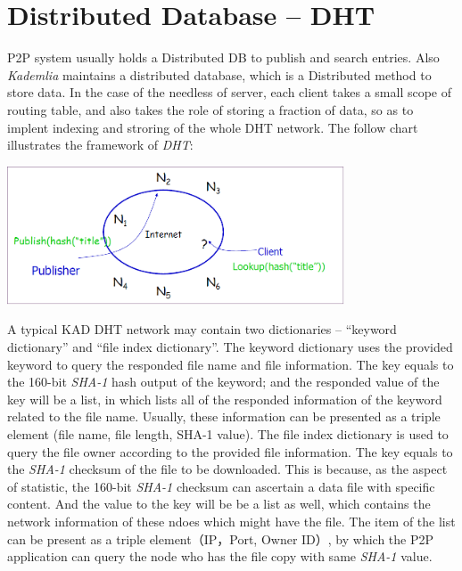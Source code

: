 \section{Distributed Database -- DHT}
{
P2P system usually holds a Distributed DB to publish and search entries.
Also \emph{Kademlia} maintains a distributed database, which is a Distributed method to store data. 
In the case of the needless of server, each client takes a small scope of routing table, and also takes the role of storing a fraction of data, so as to implent indexing and stroring of the whole DHT network.
The follow chart illustrates the framework of \emph{DHT}:
\begin{center}
  \includegraphics[width=10cm]{data/DHT.png}
\end{center}

A typical KAD DHT network may contain two dictionaries -- ``keyword dictionary'' and ``file index dictionary''.
The keyword dictionary uses the provided keyword to query the responded file name and file information. 
The key equals to the 160-bit \emph{SHA-1} hash output of the keyword; and the responded value of the key will be a list, in which lists all of the responded information of the keyword related to the file name.
Usually, these information can be presented as a triple element (file name, file length, SHA-1 value). 
The file index dictionary is used to query the file owner according to the provided file information. 
The key equals to the \emph{SHA-1} checksum of the file to be downloaded. This is because, as the aspect of statistic, the 160-bit \emph{SHA-1} checksum can ascertain a data file with specific content.
And the value to the key will be be a list as well, which contains the network information of these ndoes which might have the file.
The item of the list can be present as a triple element（IP，Port, Owner ID）, by which the P2P application can query the node who has the file copy with same \emph{SHA-1} value.

}


